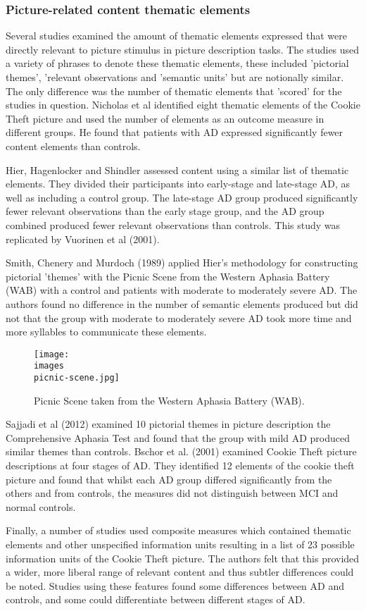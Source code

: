 \documentclass[12pt, twoside, a4paper]{article}
\begin{document}
\subsubsection{Picture-related content thematic elements}
Several studies examined the amount of thematic elements expressed that were directly relevant to picture stimulus in picture description tasks. The studies used a variety of phrases to denote these thematic elements, these included 'pictorial themes', 'relevant observations and 'semantic units' but are notionally similar. The only difference was the number of thematic elements that 'scored' for the studies in question. Nicholas et al identified eight thematic elements of the Cookie Theft picture and used the number of elements as an outcome measure in different groups. He found that patients with AD expressed significantly fewer content elements than controls.
\par
Hier, Hagenlocker and Shindler assessed content using a similar list of thematic elements. They divided their participants into early-stage and late-stage AD, as well as including a control group. The late-stage AD group produced significantly fewer relevant observations than the early stage group, and the AD group combined produced fewer relevant observations than controls. This study was replicated by Vuorinen et al (2001).
\par
Smith, Chenery and Murdoch (1989) applied Hier's methodology for constructing pictorial 'themes' with the Picnic Scene from the Western Aphasia Battery (WAB) with a control and patients with moderate to moderately severe AD. The authors found no difference in the number of semantic elements produced but did not that the group with moderate to moderately severe AD took more time and more syllables to communicate these elements.
\par
\begin{figure}[H]
\centering
\texttt{[image: \\images\\picnic-scene.jpg]}
\caption{Picnic Scene taken from the Western Aphasia Battery (WAB).\label{white}}
\end{figure}
Sajjadi et al (2012) examined 10 pictorial themes in picture description the Comprehensive Aphasia Test and found that the group with mild AD produced similar themes than controls. Bschor et al. (2001) examined Cookie Theft picture descriptions at four stages of AD. They identified 12 elements of the cookie theft picture and found that whilst each AD group differed significantly from the others and from controls, the measures did not distinguish between MCI and normal controls.
\par
Finally, a number of studies used composite measures which contained thematic elements and other unspecified information units resulting in a list of 23 possible information units of the Cookie Theft picture. The authors felt that this provided a wider, more liberal range of relevant content and thus subtler differences could be noted. Studies using these features found some differences between AD and controls, and some could differentiate between different stages of AD.
\end{document}
